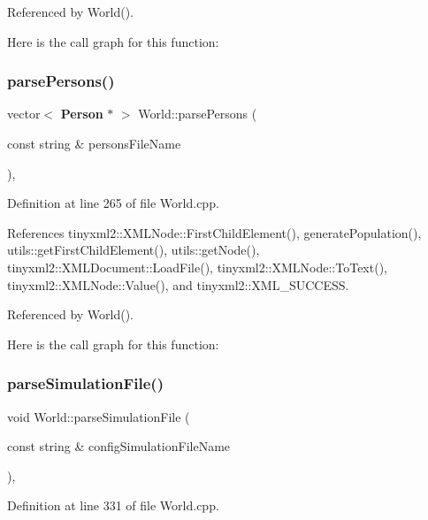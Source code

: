 Referenced by World().

Here is the call graph for this function\+:
\mbox{\label{class_world_a8bdce1dbc8d7a653d63a59674e283622}} 
\subsubsection{parse\+Persons()}
{\footnotesize\ttfamily vector$<$ \textbf{ Person} $\ast$ $>$ World\+::parse\+Persons (\begin{DoxyParamCaption}\item[{const string \&}]{persons\+File\+Name }\end{DoxyParamCaption})\hspace{0.3cm}{\ttfamily [private]}, {\ttfamily [noexcept]}}



Definition at line 265 of file World.\+cpp.



References tinyxml2\+::\+X\+M\+L\+Node\+::\+First\+Child\+Element(), generate\+Population(), utils\+::get\+First\+Child\+Element(), utils\+::get\+Node(), tinyxml2\+::\+X\+M\+L\+Document\+::\+Load\+File(), tinyxml2\+::\+X\+M\+L\+Node\+::\+To\+Text(), tinyxml2\+::\+X\+M\+L\+Node\+::\+Value(), and tinyxml2\+::\+X\+M\+L\+\_\+\+S\+U\+C\+C\+E\+SS.



Referenced by World().

Here is the call graph for this function\+:
\mbox{\label{class_world_a7f00dc79cc98281dbf7c51fb2c83e8d6}} 
\subsubsection{parse\+Simulation\+File()}
{\footnotesize\ttfamily void World\+::parse\+Simulation\+File (\begin{DoxyParamCaption}\item[{const string \&}]{config\+Simulation\+File\+Name }\end{DoxyParamCaption})\hspace{0.3cm}{\ttfamily [private]}, {\ttfamily [noexcept]}}



Definition at line 331 of file World.\+cpp.



